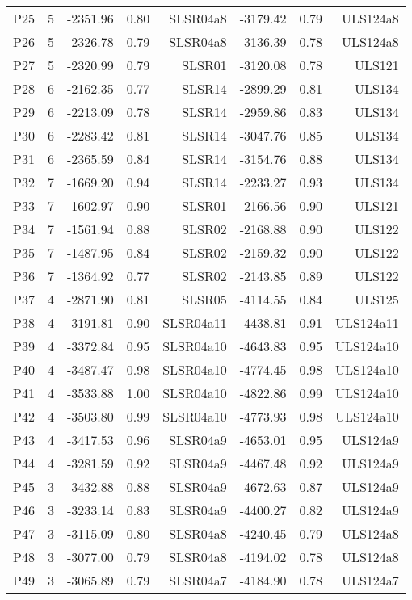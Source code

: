 \begin{center}
\begin{supertabular}{|c|c|rrr|rrr|}
P25 & 5 & -2351.96 & 0.80 & SLSR04a8 & -3179.42 & 0.79 & ULS124a8\\
P26 & 5 & -2326.78 & 0.79 & SLSR04a8 & -3136.39 & 0.78 & ULS124a8\\
P27 & 5 & -2320.99 & 0.79 & SLSR01 & -3120.08 & 0.78 & ULS121\\
P28 & 6 & -2162.35 & 0.77 & SLSR14 & -2899.29 & 0.81 & ULS134\\
P29 & 6 & -2213.09 & 0.78 & SLSR14 & -2959.86 & 0.83 & ULS134\\
P30 & 6 & -2283.42 & 0.81 & SLSR14 & -3047.76 & 0.85 & ULS134\\
P31 & 6 & -2365.59 & 0.84 & SLSR14 & -3154.76 & 0.88 & ULS134\\
P32 & 7 & -1669.20 & 0.94 & SLSR14 & -2233.27 & 0.93 & ULS134\\
P33 & 7 & -1602.97 & 0.90 & SLSR01 & -2166.56 & 0.90 & ULS121\\
P34 & 7 & -1561.94 & 0.88 & SLSR02 & -2168.88 & 0.90 & ULS122\\
P35 & 7 & -1487.95 & 0.84 & SLSR02 & -2159.32 & 0.90 & ULS122\\
P36 & 7 & -1364.92 & 0.77 & SLSR02 & -2143.85 & 0.89 & ULS122\\
P37 & 4 & -2871.90 & 0.81 & SLSR05 & -4114.55 & 0.84 & ULS125\\
P38 & 4 & -3191.81 & 0.90 & SLSR04a11 & -4438.81 & 0.91 & ULS124a11\\
P39 & 4 & -3372.84 & 0.95 & SLSR04a10 & -4643.83 & 0.95 & ULS124a10\\
P40 & 4 & -3487.47 & 0.98 & SLSR04a10 & -4774.45 & 0.98 & ULS124a10\\
P41 & 4 & -3533.88 & 1.00 & SLSR04a10 & -4822.86 & 0.99 & ULS124a10\\
P42 & 4 & -3503.80 & 0.99 & SLSR04a10 & -4773.93 & 0.98 & ULS124a10\\
P43 & 4 & -3417.53 & 0.96 & SLSR04a9 & -4653.01 & 0.95 & ULS124a9\\
P44 & 4 & -3281.59 & 0.92 & SLSR04a9 & -4467.48 & 0.92 & ULS124a9\\
P45 & 3 & -3432.88 & 0.88 & SLSR04a9 & -4672.63 & 0.87 & ULS124a9\\
P46 & 3 & -3233.14 & 0.83 & SLSR04a9 & -4400.27 & 0.82 & ULS124a9\\
P47 & 3 & -3115.09 & 0.80 & SLSR04a8 & -4240.45 & 0.79 & ULS124a8\\
P48 & 3 & -3077.00 & 0.79 & SLSR04a8 & -4194.02 & 0.78 & ULS124a8\\
P49 & 3 & -3065.89 & 0.79 & SLSR04a7 & -4184.90 & 0.78 & ULS124a7\\

\end{supertabular}
\end{center}
